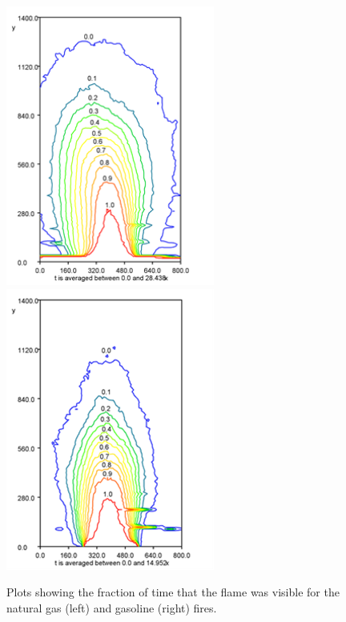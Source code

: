 \documentclass[twoside]{uocthesis}
\begin{document}
{{\begin{figure}
  \includegraphics[width=2.7in]{../Figures/Fig20}
  \includegraphics[width=2.7in]{../Figures/Fig21} \\
  \caption[Visibility fractions for the natural gas and gasoline fires]{Plots showing the fraction of time that the flame was visible for the natural gas (left) and gasoline (right) fires.}
  \label{Gas_and_Gasoline_Contours}
\end{figure}

}}
\end{document}
